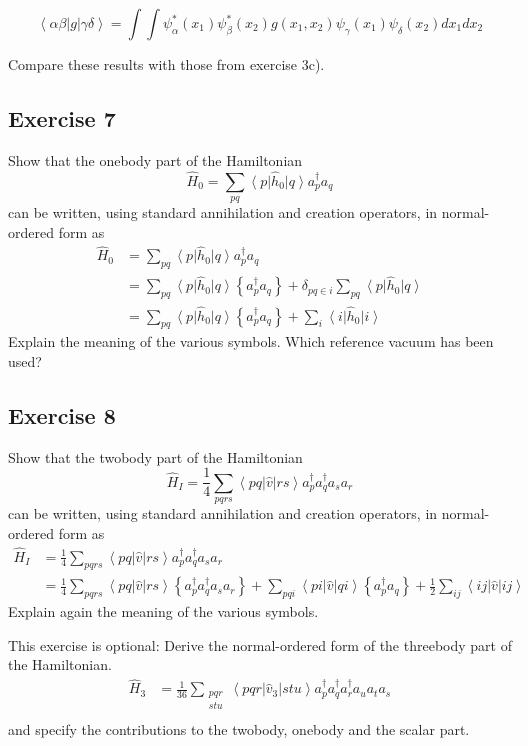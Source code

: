 \documentclass[prc]{revtex4}
\newcommand{\bra}[1]{\left\langle #1 \right|}
\newcommand{\ket}[1]{\left| #1 \right\rangle}
\newcommand{\element}[3]
    {\bra{#1}#2\ket{#3}}
\newcommand{\normord}[1]{
    \left\{#1\right\}
}
\begin{document}
\[
\bra{\alpha\beta}g\ket{\gamma\delta}=
\int\int \psi_{\alpha}^{*}(x_{1})\psi_{\beta}^{*}(x_{2})g(x_{1},
x_{2})\psi_{\gamma}(x_{1})\psi_{\delta}(x_{2})dx_{1}dx_{2}
\]

Compare these results with those from exercise 3c).


\subsection*{Exercise 7}

Show that the onebody part of the Hamiltonian
    \begin{equation*}
        \hat{H}_0 = \sum_{pq} \element{p}{\hat{h}_0}{q} a^\dagger_p a_q
    \end{equation*}
can be written, using standard annihilation and creation operators, in normal-ordered form as 
    \begin{align*}
        \hat{H}_0 &= \sum_{pq} \element{p}{\hat{h}_0}{q} a^\dagger_p a_q \nonumber \\
            &= \sum_{pq} \element{p}{\hat{h}_0}{q} \left\{a^\dagger_p a_q\right\} + 
                \delta_{pq\in i} \sum_{pq} \element{p}{\hat{h}_0}{q} \nonumber \\
            &= \sum_{pq} \element{p}{\hat{h}_0}{q} \left\{a^\dagger_p a_q\right\} +
                \sum_i \element{i}{\hat{h}_0}{i}
    \end{align*}
Explain the meaning of the various symbols. Which reference 
vacuum has been used?

\subsection*{Exercise 8}
Show that the twobody part of the Hamiltonian
    \begin{equation*}
        \hat{H}_I = \frac{1}{4} \sum_{pqrs} \element{pq}{\hat{v}}{rs} a^\dagger_p a^\dagger_q a_s  a_r
    \end{equation*}
can be written, using standard annihilation and creation operators, in normal-ordered form as 
    \begin{align*}
    \hat{H}_I &= \frac{1}{4} \sum_{pqrs} \element{pq}{\hat{v}}{rs} a^\dagger_p a^\dagger_q a_s  a_r \nonumber \\
        &= \frac{1}{4} \sum_{pqrs} \element{pq}{\hat{v}}{rs} \normord{a^\dagger_p a^\dagger_q a_s  a_r}
            + \sum_{pqi} \element{pi}{\hat{v}}{qi} \normord{a^\dagger_p a_q} 
            + \frac{1}{2} \sum_{ij} \element{ij}{\hat{v}}{ij}
    \end{align*}
Explain again the meaning of the various symbols.

This exercise is optional: Derive the normal-ordered form of the threebody part of the Hamiltonian.
    \begin{align*}
    \hat{H}_3 &= \frac{1}{36} \sum_{\substack{
                        pqr \\
                        stu}}
                 \element{pqr}{\hat{v}_3}{stu} a^\dagger_p a^\dagger_q a^\dagger_r a_u a_t a_s\\
    \end{align*}
and specify the contributions to the twobody, onebody and the scalar part.
\end{document}
